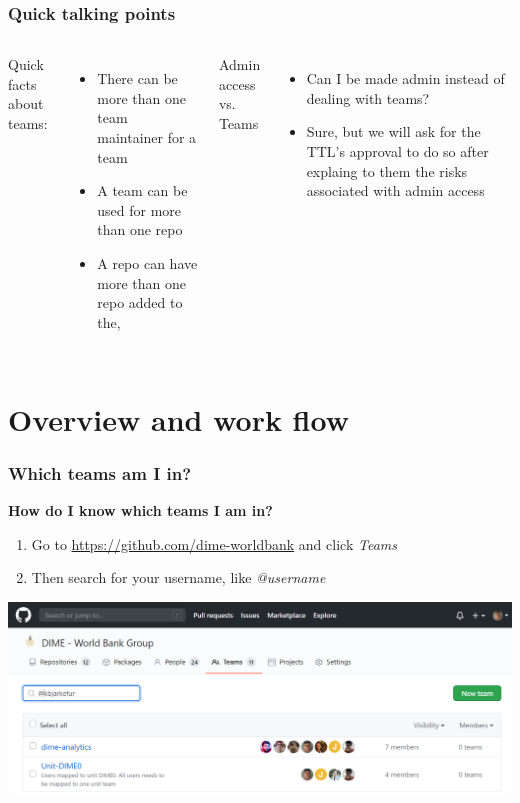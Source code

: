 \documentclass[aspectratio=169]{beamer} %
\begin{document}
\begin{frame}
	\frametitle{Quick talking points}
	
	\begin{columns}[c]
		
		Quick facts about teams:
		\begin{itemize}
			\item There can be more than one team maintainer for a team
			\item A team can be used for more than one repo
			\item A repo can have more than one repo added to the,
		\end{itemize}
		
		Admin access vs. Teams
		\begin{itemize}
			\item Can I be made admin instead of dealing with teams?
			\item Sure, but we will ask for the TTL's approval to do so after explaing to them the risks associated with admin access
		\end{itemize}	
		
	\end{columns}
\end{frame}


\section{Overview and work flow}

\begin{frame}
	\frametitle{Which teams am I in?}
	\textbf{How do I know which teams I am in?}
	\begin{enumerate}
		\item Go to \url{https://github.com/dime-worldbank} and click \textit{Teams}
		\item Then search for your username, like \textit{@username}
	\end{enumerate}
	\centering
	\includegraphics[width=.8\linewidth]{./img/which-teams-am-i-in}
\end{frame}
\end{document}
